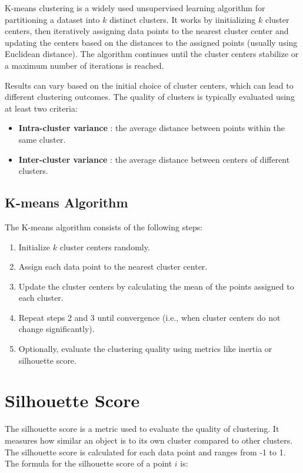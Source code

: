 K-means clustering is a widely used unsupervised learning algorithm for partitioning a dataset into $k$ distinct clusters.
It works by iinitializing $k$ cluster centers, then iteratively assigning data points to the nearest cluster center and
updating the centers based on the distances to the assigned points (usually using Euclidean distance). The algorithm
continues until the cluster centers stabilize or a maximum number of iterations is reached.

Results can vary based on the initial choice of cluster centers, which can lead to different clustering outcomes.
The quality of clusters is typically evaluated using at least two criteria:

\begin{itemize}
	\item \textbf{Intra-cluster variance} : the average distance between points within the same cluster.
	\item \textbf{Inter-cluster variance} : the average distance between centers of different clusters.
\end{itemize}

\subsection{K-means Algorithm}
\label{subsec:kmeans_algorithm}

The K-means algorithm consists of the following steps:
\begin{enumerate}
	\item Initialize $k$ cluster centers randomly.
	\item Assign each data point to the nearest cluster center.
	\item Update the cluster centers by calculating the mean of the points assigned to each cluster.
	\item Repeat steps 2 and 3 until convergence (i.e., when cluster centers do not change significantly).
	\item Optionally, evaluate the clustering quality using metrics like inertia or silhouette score.
\end{enumerate}

\section{Silhouette Score}
\label{subsec:silhouette_score}

The silhouette score is a metric used to evaluate the quality of clustering. It measures how similar an object
is to its own cluster compared to other clusters. The silhouette score is calculated for each data point and
ranges from -1 to 1. The formula for the silhouette score of a point $i$ is:

